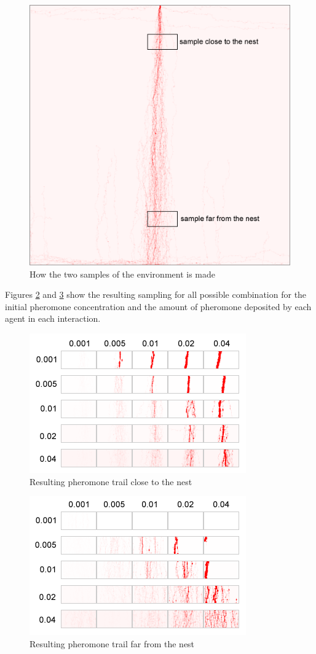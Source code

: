 \begin{figure}[H]
  \centering
  \includegraphics[width=0.5\linewidth]{gfx/initial-sample.png}
  \caption{How the two samples of the environment is made}
  \label{fig:initial-sample}
\end{figure}

Figures \ref{fig:initial-var-close} and \ref{fig:initial-var-far} show the resulting sampling for all possible combination for the initial pheromone concentration and the amount of pheromone deposited by each agent in each interaction.

\begin{figure}[H]
  \centering
  \includegraphics[width=0.6\linewidth]{gfx/initial-variations-close.png}
  \caption{Resulting pheromone trail close to the nest}
  \label{fig:initial-var-close}
\end{figure}


\begin{figure}[H]
  \centering
  \includegraphics[width=0.6\linewidth]{gfx/initial-variations-far.png}
  \caption{Resulting pheromone trail far from the nest}
  \label{fig:initial-var-far}
\end{figure}

